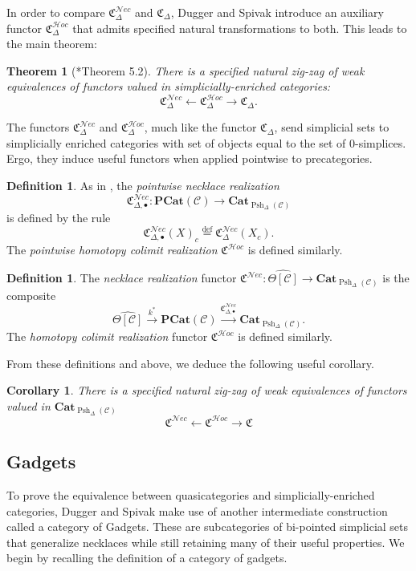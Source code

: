 \documentclass[a4paper]{article}
\numberwithin{equation}{subsection}
\theoremstyle{plain}   %
\newtheorem{thm}[equation]{Theorem}
\newtheorem{cor}[equation]{Corollary}
\theoremstyle{definition}
\newtheorem{defn}[equation]{Definition}
\theoremstyle{remark}
\theoremstyle{plain}
\newcommand{\Nec}{\ensuremath{{\mathcal{N}ec}}}
\newcommand{\Hoc}{\ensuremath{{\mathcal{H}oc}}}
\newcommand{\Cat}{\ensuremath{\mathbf{Cat}}}
\providecommand{\C}{}
\renewcommand{\C}{\ensuremath{\mathcal{C}}}
\newcommand{\defeq}{\overset{\mathrm{def}}=}
\newcommand{\cellset}{\ensuremath{\widehat{\Theta[\mathcal{C}]}}}
\newcommand{\spsh}{\ensuremath{\operatorname{Psh}_\Delta(\mathcal{C})}}
\begin{document}
In order to compare \(\mathfrak{C}^{\Nec}_\Delta\) and \(\mathfrak{C}_\Delta\), Dugger and Spivak introduce an auxiliary functor \(\mathfrak{C}^{\Hoc}_\Delta\) that admits specified natural transformations to both.  This leads to the main theorem:

\begin{thm}[\cite{ds1}*{Theorem 5.2}]\label{dugspivthm}
	There is a specified natural zig-zag of weak equivalences of functors valued in simplicially-enriched categories:
	\[
		\mathfrak{C}^{\Nec}_\Delta \leftarrow \mathfrak{C}^{\Hoc}_\Delta \to \mathfrak{C}_\Delta.
	\]
\end{thm}

The functors \(\mathfrak{C}_\Delta^{\Nec}\) and \(\mathfrak{C}_\Delta^{\Hoc}\), much like the functor \(\mathfrak{C}_\Delta\), send simplicial sets to simplicially enriched categories with set of objects equal to the set of \(0\)-simplices.  Ergo, they induce useful functors when applied pointwise to precategories.
\begin{defn}
	As in ,  the \emph{pointwise necklace realization}
	\[
		\mathfrak{C}^{\Nec}_{\Delta,\bullet}:\mathbf{PCat}(\C) \to \Cat_{\spsh}
	\] 
	is defined by the rule
	\[
		\mathfrak{C}^{\Nec}_{\Delta,\bullet}(X)_c\defeq \mathfrak{C}^{\Nec}_{\Delta}(X_c).
	\]
	The \emph{pointwise homotopy colimit realization} \(\mathfrak{C}^{\Hoc}\) is defined similarly.  
\end{defn}

\begin{defn}
	The \emph{necklace realization} functor \(\mathfrak{C}^{\Nec}:\cellset \to \Cat_{\spsh}\) is the composite
	\[
		\cellset \xrightarrow{k^\ast} \mathbf{PCat}(\C) \xrightarrow{\mathfrak{C}^{\Nec}_{\Delta,\bullet}} \Cat_{\spsh}.
	\]
	The \emph{homotopy colimit realization} functor \(\mathfrak{C}^{\Hoc}\) is defined similarly.
\end{defn}

From these definitions and  above, we deduce the following useful corollary.

\begin{cor}\label{necthm}
	There is a specified natural zig-zag of weak equivalences of functors valued in \(\Cat_{\spsh}\)
	\[
		\mathfrak{C}^{\Nec} \leftarrow \mathfrak{C}^{\Hoc} \to \mathfrak{C}
	\]
\end{cor}

\subsection{Gadgets}
To prove the equivalence between quasicategories and simplicially-enriched categories, Dugger and Spivak make use of another intermediate construction called a category of Gadgets.  These are subcategories of bi-pointed simplicial sets that generalize necklaces while still retaining many of their useful properties. We begin by recalling the definition of a category of gadgets.
\end{document}
